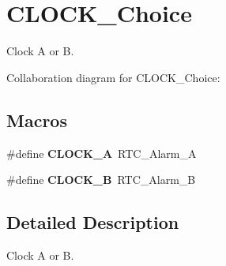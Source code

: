 \hypertarget{group___c_l_o_c_k___choice}{}\section{C\+L\+O\+C\+K\+\_\+\+Choice}
\label{group___c_l_o_c_k___choice}


Clock A or B.  


Collaboration diagram for C\+L\+O\+C\+K\+\_\+\+Choice\+:
\subsection*{Macros}
\begin{DoxyCompactItemize}
\item 
\mbox{\label{group___c_l_o_c_k___choice_gaa6850d52f4718938783dcc4b932f78ac}} 
\#define {\bfseries C\+L\+O\+C\+K\+\_\+A}~R\+T\+C\+\_\+\+Alarm\+\_\+A
\item 
\mbox{\label{group___c_l_o_c_k___choice_gaa955d6afa2e3fcc5dc68064b9cd5161f}} 
\#define {\bfseries C\+L\+O\+C\+K\+\_\+B}~R\+T\+C\+\_\+\+Alarm\+\_\+B
\end{DoxyCompactItemize}


\subsection{Detailed Description}
Clock A or B. 

